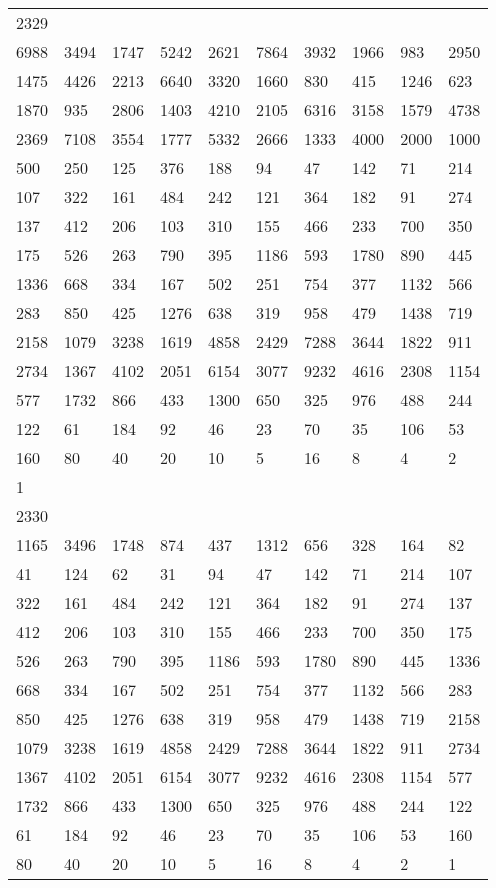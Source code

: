 \begin{longtable}{*{10}{l}}
2329&&&&&&&&&\\
6988& 3494& 1747& 5242& 2621& 7864& 3932& 1966& 983& 2950\\
1475& 4426& 2213& 6640& 3320& 1660& 830& 415& 1246& 623\\
1870& 935& 2806& 1403& 4210& 2105& 6316& 3158& 1579& 4738\\
2369& 7108& 3554& 1777& 5332& 2666& 1333& 4000& 2000& 1000\\
500& 250& 125& 376& 188& 94& 47& 142& 71& 214\\
107& 322& 161& 484& 242& 121& 364& 182& 91& 274\\
137& 412& 206& 103& 310& 155& 466& 233& 700& 350\\
175& 526& 263& 790& 395& 1186& 593& 1780& 890& 445\\
1336& 668& 334& 167& 502& 251& 754& 377& 1132& 566\\
283& 850& 425& 1276& 638& 319& 958& 479& 1438& 719\\
2158& 1079& 3238& 1619& 4858& 2429& 7288& 3644& 1822& 911\\
2734& 1367& 4102& 2051& 6154& 3077& 9232& 4616& 2308& 1154\\
577& 1732& 866& 433& 1300& 650& 325& 976& 488& 244\\
122& 61& 184& 92& 46& 23& 70& 35& 106& 53\\
160& 80& 40& 20& 10& 5& 16& 8& 4& 2\\
1& \\

2330&&&&&&&&&\\
1165& 3496& 1748& 874& 437& 1312& 656& 328& 164& 82\\
41& 124& 62& 31& 94& 47& 142& 71& 214& 107\\
322& 161& 484& 242& 121& 364& 182& 91& 274& 137\\
412& 206& 103& 310& 155& 466& 233& 700& 350& 175\\
526& 263& 790& 395& 1186& 593& 1780& 890& 445& 1336\\
668& 334& 167& 502& 251& 754& 377& 1132& 566& 283\\
850& 425& 1276& 638& 319& 958& 479& 1438& 719& 2158\\
1079& 3238& 1619& 4858& 2429& 7288& 3644& 1822& 911& 2734\\
1367& 4102& 2051& 6154& 3077& 9232& 4616& 2308& 1154& 577\\
1732& 866& 433& 1300& 650& 325& 976& 488& 244& 122\\
61& 184& 92& 46& 23& 70& 35& 106& 53& 160\\
80& 40& 20& 10& 5& 16& 8& 4& 2& 1\\


\end{longtable}
